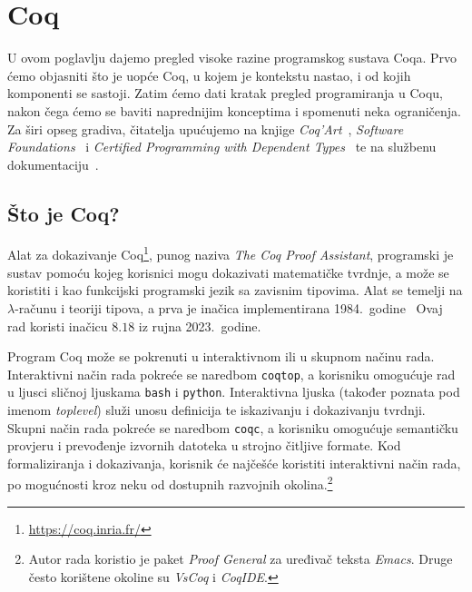 \chapter{Coq}\label{pog:glavni_dio}
U ovom poglavlju dajemo pregled visoke razine programskog sustava Coqa.
Prvo ćemo objasniti što je uopće Coq, u kojem je kontekstu nastao, i od kojih komponenti se sastoji.
Zatim ćemo dati kratak pregled programiranja u Coqu, nakon čega ćemo se baviti naprednijim konceptima i spomenuti neka ograničenja.
Za širi opseg gradiva, čitatelja upućujemo na knjige \textit{Coq'Art}~\cite{coqart}, \textit{Software Foundations}~\cite{sf-lf, sf-plf, sf-vfa} i \textit{Certified Programming with Dependent Types}~\cite{cpdt} te na službenu dokumentaciju~\cite{coqrefman}.

\section{Što je Coq?}\label{sec:osnovno-o-coqu}
Alat za dokazivanje Coq\footnote{\url{https://coq.inria.fr/}}, punog naziva \textit{The Coq Proof Assistant},
programski je sustav pomoću kojeg korisnici mogu dokazivati matematičke tvrdnje, a može se koristiti i kao funkcijski programski jezik sa zavisnim tipovima.
Alat se temelji na \(\lambda\)-računu i teoriji tipova, a prva je inačica implementirana 1984.~godine~\cite{coqrefman}
Ovaj rad koristi inačicu \(8.18\) iz rujna 2023.~godine.

Program Coq može se pokrenuti u interaktivnom ili u skupnom načinu rada.
Interaktivni način rada pokreće se naredbom \texttt{coqtop}, a korisniku omogućuje rad u ljusci sličnoj ljuskama \texttt{bash} i \texttt{python}.
Interaktivna ljuska (također poznata pod imenom \textit{toplevel}) služi unosu definicija te iskazivanju i dokazivanju tvrdnji.
Skupni način rada pokreće se naredbom \texttt{coqc}, a korisniku omogućuje semantičku provjeru i prevođenje izvornih datoteka u strojno čitljive formate.
Kod formaliziranja i dokazivanja, korisnik će najčešće koristiti interaktivni način rada, po mogućnosti kroz neku od dostupnih razvojnih okolina.\footnote{Autor rada koristio je paket \textit{Proof General} za uređivač teksta \textit{Emacs}. Druge često korištene okoline su \textit{VsCoq} i \textit{CoqIDE}.}


